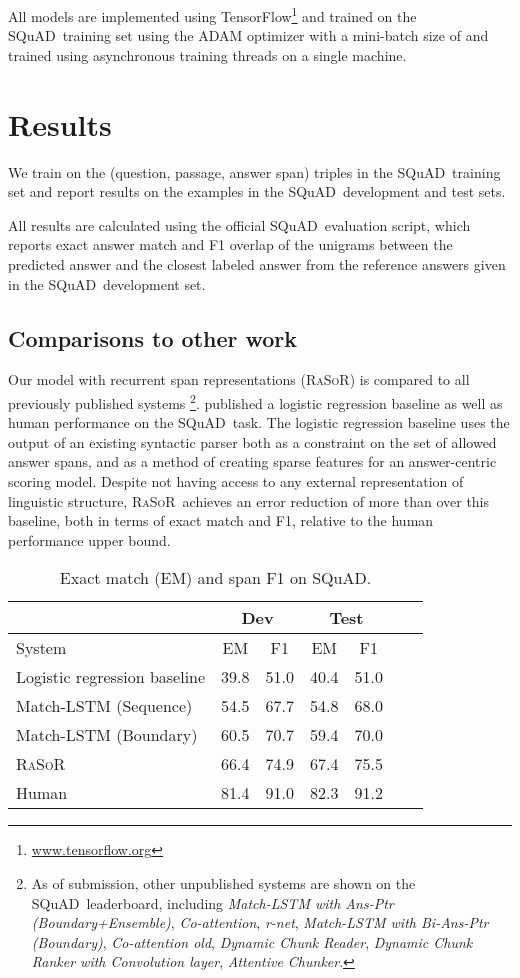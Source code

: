 \documentclass{article} \usepackage{iclr2017_conference,times}
\newcommand{\squad}{{\sc SQuAD}}
\newcommand{\ourmodel}{\textsc{RaSoR}}
\begin{document}
All models are implemented using TensorFlow\footnote{\url{www.tensorflow.org}} and trained on the \squad~training set using the ADAM \citep{kingma2014adam} optimizer with a mini-batch size of  and trained using  asynchronous training threads on a single machine.
 \section{Results}\label{sec:results}
We train on the  (question, passage, answer span) triples in the \squad~training set and report results on the  examples in the \squad~development and test sets.

All results are calculated using the official \squad~evaluation script, which reports exact answer match and F1 overlap of the unigrams between the predicted answer and the closest labeled answer from the  reference answers given in the \squad~development set.

\subsection{Comparisons to other work}
Our model with recurrent span representations (\ourmodel) is compared to all previously published systems
\footnote{\label{ftnt:leaderboard}As of submission, other unpublished systems are shown on the \squad~leaderboard, including \textit{Match-LSTM with Ans-Ptr (Boundary+Ensemble)}, \textit{Co-attention}, \textit{r-net}, \textit{Match-LSTM with Bi-Ans-Ptr (Boundary)}, \textit{Co-attention old}, \textit{Dynamic Chunk Reader}, \textit{Dynamic Chunk Ranker with Convolution layer}, \textit{Attentive Chunker}.}.
\cite{rajpurkar:2016} published a logistic regression baseline as well as human performance on the \squad~task.
The logistic regression baseline uses the output of an existing syntactic parser both as a constraint on the set of allowed answer spans, and as a method of creating sparse features for an answer-centric scoring model.
Despite not having access to any external representation of linguistic structure, \ourmodel~achieves an error reduction of more than  over this baseline, both in terms of exact match and F1, relative to the human performance upper bound.
\begin{table}[htp]
\begin{center}
\begin{tabularx}{0.6\textwidth}{ l c c c c c c}
 & \multicolumn{2}{c}{Dev}  & \multicolumn{2}{c}{Test} \\
 \midrule
 System & EM & F1 & EM & F1\\
\midrule
Logistic regression baseline & 39.8 & 51.0 & 40.4 & 51.0 \\
Match-LSTM (Sequence) & 54.5 & 67.7 & 54.8 & 68.0 \\
Match-LSTM (Boundary) & 60.5 & 70.7 & 59.4 & 70.0 \\
\ourmodel & 66.4 & 74.9 & 67.4 & 75.5 \\
Human & 81.4 & 91.0 & 82.3 & 91.2 \\
\end{tabularx}
\end{center}
\caption{Exact match (EM) and span F1 on \squad.}
\label{tab:results}
\end{table}
\end{document}
